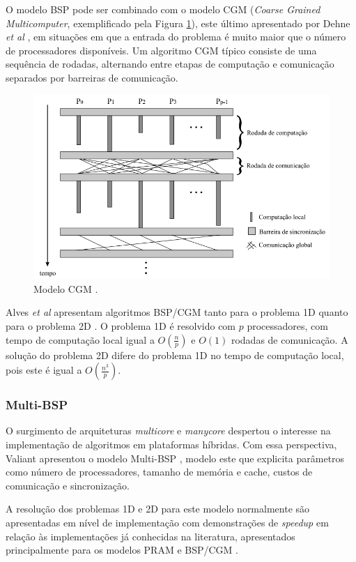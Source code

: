 \documentclass[a4paper, 12pt] {article}
\begin{document}
O modelo BSP pode ser combinado com o modelo CGM (\textit{Coarse Grained
Multicomputer}, exemplificado pela Figura \ref{fig:cgm}), este último
apresentado por Dehne \textit{et al} \cite{Dehne:1993:SPG:160985.161154}, em situações em que a entrada do problema é
muito maior que o número de processadores disponíveis. Um algoritmo CGM típico
consiste de uma sequência de rodadas, alternando entre etapas de computação e
comunicação separados por barreiras de comunicação.

\begin{figure}[ht]
\centering
\includegraphics[width=.6\textwidth]{cgm.png}
\caption{Modelo CGM \cite{loureiro2010}. }
\label{fig:cgm}
\end{figure}

Alves \textit{et al} apresentam algoritmos BSP/CGM tanto para o problema 1D
quanto para o problema 2D \cite{alves2004}. O problema 1D é resolvido
com $p$ processadores, com tempo de computação local igual a  $O(\frac{n}{p})$ e $O(1)$
rodadas de comunicação. A solução do problema 2D difere do problema 1D no tempo
de computação local, pois este é igual a $O(\frac{n^3}{p})$.

\subsubsection{Multi-BSP}

O surgimento de arquiteturas \textit{multicore} e \textit{manycore} despertou o
interesse na implementação de algoritmos em plataformas
híbridas. Com essa perspectiva, Valiant apresentou o modelo Multi-BSP
\cite{Valiant:2008:BMM:1431008.1431011}, modelo este que explicita parâmetros
como número de processadores, tamanho de memória e cache, custos de comunicação
e sincronização.

A resolução dos problemas 1D e 2D para este modelo normalmente são apresentadas
em nível de implementação com demonstrações de \textit{speedup} em relação às
implementações já conhecidas na literatura, apresentados principalmente para os
modelos PRAM e BSP/CGM \cite{6473291,doi:10.1117/12.928318,takaoka2014efficient}.
\end{document}
